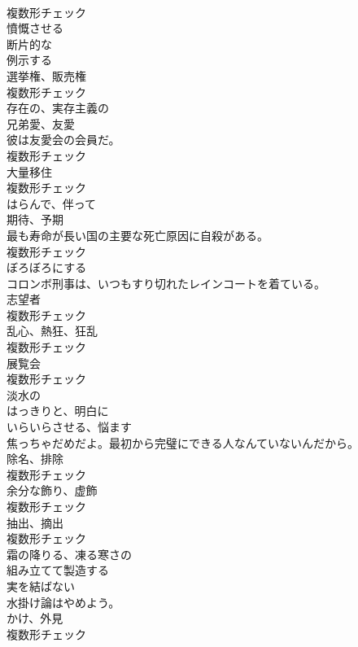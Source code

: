 \documentclass[8pt]{extreport}
\begin{document}
\begin{CJK}{UTF8}{min}
\\	複数形チェック
\\	[動詞]	憤慨させる	
\\	[形容詞]	断片的な	
\\	[動詞]	例示する	
\\	[名詞]	選挙権、販売権	
\\	複数形チェック
\\	[形容詞]	存在の、実存主義の	
\\	[名詞]	兄弟愛、友愛	
\\	彼は友愛会の会員だ。	
\\	複数形チェック
\\	[名詞]	大量移住	
\\	複数形チェック
\\	[形容詞]	はらんで、伴って	
\\	[名詞]	期待、予期	
\\	最も寿命が長い国の主要な死亡原因に自殺がある。	
\\	複数形チェック
\\	[動詞]	ぼろぼろにする	
\\	コロンボ刑事は、いつもすり切れたレインコートを着ている。	
\\	[名詞]	志望者	
\\	複数形チェック
\\	[名詞]	乱心、熱狂、狂乱	
\\	複数形チェック
\\	[名詞]	展覧会	
\\	複数形チェック
\\	[形容詞]	淡水の	
\\	[形容詞]	はっきりと、明白に	
\\	[動詞]	いらいらさせる、悩ます	
\\	焦っちゃだめだよ。最初から完璧にできる人なんていないんだから。	
\\	[名詞]	除名、排除	
\\	複数形チェック
\\	[名詞]	余分な飾り、虚飾	
\\	複数形チェック
\\	[名詞]	抽出、摘出	
\\	複数形チェック
\\	[形容詞]	霜の降りる、凍る寒さの	
\\	[動詞]	組み立てて製造する	
\\	[形容詞]	実を結ばない	
\\	水掛け論はやめよう。	
\\	[名詞]	かけ、外見	
\\	複数形チェック

\end{CJK}
\end{document}
